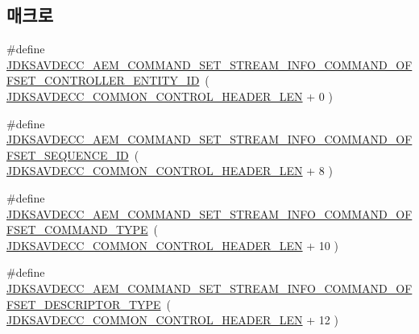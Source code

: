 \subsection*{매크로}
\begin{DoxyCompactItemize}
\item 
\#define \hyperlink{group__command__set__stream__info_gafc14cf65f1fb7f017df2e4c2e9e7c7fe}{J\+D\+K\+S\+A\+V\+D\+E\+C\+C\+\_\+\+A\+E\+M\+\_\+\+C\+O\+M\+M\+A\+N\+D\+\_\+\+S\+E\+T\+\_\+\+S\+T\+R\+E\+A\+M\+\_\+\+I\+N\+F\+O\+\_\+\+C\+O\+M\+M\+A\+N\+D\+\_\+\+O\+F\+F\+S\+E\+T\+\_\+\+C\+O\+N\+T\+R\+O\+L\+L\+E\+R\+\_\+\+E\+N\+T\+I\+T\+Y\+\_\+\+ID}~( \hyperlink{group__jdksavdecc__avtp__common__control__header_gaae84052886fb1bb42f3bc5f85b741dff}{J\+D\+K\+S\+A\+V\+D\+E\+C\+C\+\_\+\+C\+O\+M\+M\+O\+N\+\_\+\+C\+O\+N\+T\+R\+O\+L\+\_\+\+H\+E\+A\+D\+E\+R\+\_\+\+L\+EN} + 0 )
\item 
\#define \hyperlink{group__command__set__stream__info_ga3fe4ca32da8c1ee482a2328092cd1aaa}{J\+D\+K\+S\+A\+V\+D\+E\+C\+C\+\_\+\+A\+E\+M\+\_\+\+C\+O\+M\+M\+A\+N\+D\+\_\+\+S\+E\+T\+\_\+\+S\+T\+R\+E\+A\+M\+\_\+\+I\+N\+F\+O\+\_\+\+C\+O\+M\+M\+A\+N\+D\+\_\+\+O\+F\+F\+S\+E\+T\+\_\+\+S\+E\+Q\+U\+E\+N\+C\+E\+\_\+\+ID}~( \hyperlink{group__jdksavdecc__avtp__common__control__header_gaae84052886fb1bb42f3bc5f85b741dff}{J\+D\+K\+S\+A\+V\+D\+E\+C\+C\+\_\+\+C\+O\+M\+M\+O\+N\+\_\+\+C\+O\+N\+T\+R\+O\+L\+\_\+\+H\+E\+A\+D\+E\+R\+\_\+\+L\+EN} + 8 )
\item 
\#define \hyperlink{group__command__set__stream__info_gab8e20e3d031b292943a8ea1861dacbd1}{J\+D\+K\+S\+A\+V\+D\+E\+C\+C\+\_\+\+A\+E\+M\+\_\+\+C\+O\+M\+M\+A\+N\+D\+\_\+\+S\+E\+T\+\_\+\+S\+T\+R\+E\+A\+M\+\_\+\+I\+N\+F\+O\+\_\+\+C\+O\+M\+M\+A\+N\+D\+\_\+\+O\+F\+F\+S\+E\+T\+\_\+\+C\+O\+M\+M\+A\+N\+D\+\_\+\+T\+Y\+PE}~( \hyperlink{group__jdksavdecc__avtp__common__control__header_gaae84052886fb1bb42f3bc5f85b741dff}{J\+D\+K\+S\+A\+V\+D\+E\+C\+C\+\_\+\+C\+O\+M\+M\+O\+N\+\_\+\+C\+O\+N\+T\+R\+O\+L\+\_\+\+H\+E\+A\+D\+E\+R\+\_\+\+L\+EN} + 10 )
\item 
\#define \hyperlink{group__command__set__stream__info_ga9a25e09f9ea27a3b22b17ea62471ac66}{J\+D\+K\+S\+A\+V\+D\+E\+C\+C\+\_\+\+A\+E\+M\+\_\+\+C\+O\+M\+M\+A\+N\+D\+\_\+\+S\+E\+T\+\_\+\+S\+T\+R\+E\+A\+M\+\_\+\+I\+N\+F\+O\+\_\+\+C\+O\+M\+M\+A\+N\+D\+\_\+\+O\+F\+F\+S\+E\+T\+\_\+\+D\+E\+S\+C\+R\+I\+P\+T\+O\+R\+\_\+\+T\+Y\+PE}~( \hyperlink{group__jdksavdecc__avtp__common__control__header_gaae84052886fb1bb42f3bc5f85b741dff}{J\+D\+K\+S\+A\+V\+D\+E\+C\+C\+\_\+\+C\+O\+M\+M\+O\+N\+\_\+\+C\+O\+N\+T\+R\+O\+L\+\_\+\+H\+E\+A\+D\+E\+R\+\_\+\+L\+EN} + 12 )

\end{DoxyCompactItemize}
